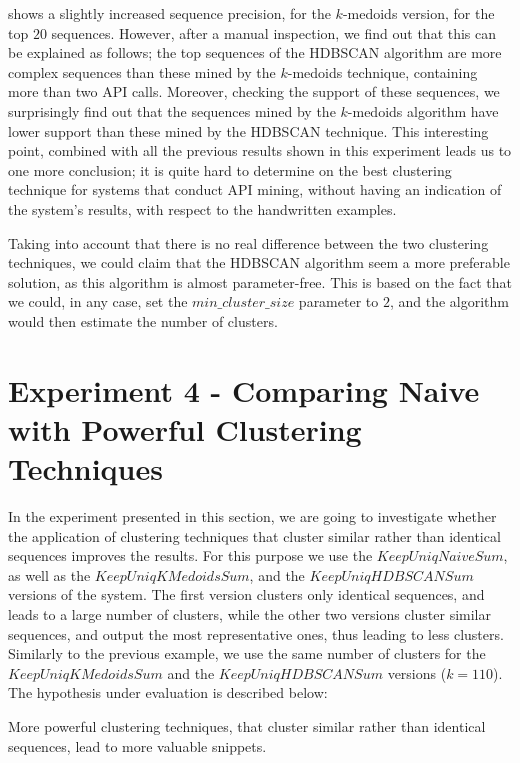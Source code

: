  shows a slightly increased sequence precision, for the $k$-medoids version, for the top $20$ sequences. However, after a manual inspection, we find out that this can be explained as follows; the top sequences of the HDBSCAN algorithm are more complex sequences than these mined by the $k$-medoids technique, containing more than two API calls. Moreover, checking the support of these sequences, we surprisingly find out that the sequences mined by the $k$-medoids algorithm have lower support than these mined by the HDBSCAN technique. This interesting point, combined with all the previous results shown in this experiment leads us to one more conclusion; it is quite hard to determine on the best clustering technique for systems that conduct API mining, without having an indication of the system's results, with respect to the handwritten examples.

Taking into account that there is no real difference between the two clustering techniques, we could claim that the HDBSCAN algorithm seem a more preferable solution, as this algorithm is almost parameter-free. This is based on the fact that we could, in any case, set the $min\_cluster\_size$ parameter to $2$, and the algorithm would then estimate the number of clusters.


\section{Experiment 4 - Comparing Naive with Powerful Clustering Techniques}
\label{sec:evaluation-exp4}

In the experiment presented in this section, we are going to investigate whether the application of clustering techniques that cluster similar rather than identical sequences improves the results. For this purpose we use the $KeepUniqNaiveSum$, as well as the $KeepUniqKMedoidsSum$, and the $KeepUniqHDBSCANSum$ versions of the system. The first version clusters only identical sequences, and leads to a large number of clusters, while the other two versions cluster similar sequences, and output the most representative ones, thus leading to less clusters. Similarly to the previous example, we use the same number of clusters for the $KeepUniqKMedoidsSum$ and the $KeepUniqHDBSCANSum$ versions ($k=110$). The hypothesis under evaluation is described below:

\begin{hypothesis}
More powerful clustering techniques, that cluster similar rather than identical sequences, lead to more valuable snippets.
\end{hypothesis}

